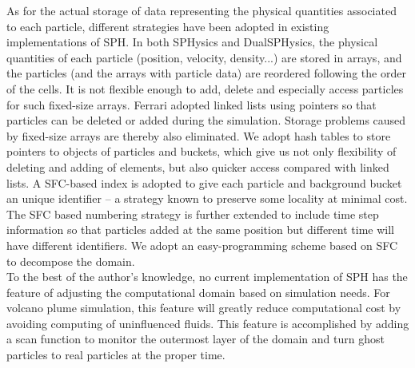 \documentclass[procedia]{easychair}
\begin{document}
As for the actual storage of data representing the physical quantities associated to each particle, different strategies have been adopted in existing implementations of SPH. 
In both SPHysics and DualSPHysics\cite{crespo2015dualsphysics}, the physical quantities of each particle (position, velocity, density...) are stored in arrays, and the particles (and the arrays with particle data) are reordered following the order of the cells. It is not flexible enough to add, delete and especially access particles for such fixed-size arrays. Ferrari\cite{ferrari2009new} adopted linked lists using pointers so that particles can be deleted or added during the simulation. Storage problems caused by fixed-size arrays are thereby also eliminated. We adopt hash tables to store pointers to objects of particles and buckets, which give us not only flexibility of deleting and adding of elements, but also quicker access compared with linked lists. A SFC-based index is adopted to give each particle and background bucket an unique identifier -- a strategy known to preserve some locality at minimal cost. The SFC based numbering strategy is further extended to include time step information so that particles added at the same position but different time will have different identifiers. 
We adopt an easy-programming scheme based on SFC \cite{patra1999efficient} to decompose the domain.\\
To the best of the author's knowledge, no current implementation of SPH has the feature of adjusting the computational domain based on simulation needs. For volcano plume simulation, this feature will greatly reduce computational cost by avoiding computing of uninfluenced fluids. This feature is accomplished by adding a scan function to monitor the outermost layer of the domain and turn ghost particles to real particles at the proper time.\\
\end{document}
